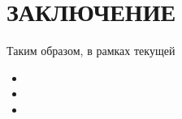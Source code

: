 \section*{ЗАКЛЮЧЕНИЕ}
Таким образом, в рамках текущей 

\begin{itemize}
	\item 
	
	\item 
	
	\item 
\end{itemize}
